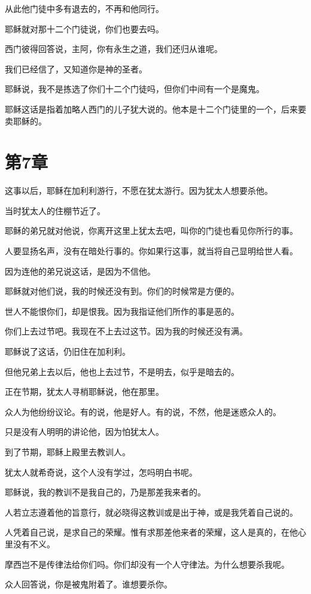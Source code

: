 \documentclass[12pt,oneside]{book}
\begin{document}
从此他门徒中多有退去的，不再和他同行。

耶稣就对那十二个门徒说，你们也要去吗。

西门彼得回答说，主阿，你有永生之道，我们还归从谁呢。

我们已经信了，又知道你是神的圣者。

耶稣说，我不是拣选了你们十二个门徒吗，但你们中间有一个是魔鬼。

耶稣这话是指着加略人西门的儿子犹大说的。他本是十二个门徒里的一个，后来要卖耶稣的。

\chapter{第7章}
这事以后，耶稣在加利利游行，不愿在犹太游行。因为犹太人想要杀他。

当时犹太人的住棚节近了。

耶稣的弟兄就对他说，你离开这里上犹太去吧，叫你的门徒也看见你所行的事。

人要显扬名声，没有在暗处行事的。你如果行这事，就当将自己显明给世人看。

因为连他的弟兄说这话，是因为不信他。

耶稣就对他们说，我的时候还没有到。你们的时候常是方便的。

世人不能恨你们，却是恨我。因为我指证他们所作的事是恶的。

你们上去过节吧。我现在不上去过这节。因为我的时候还没有满。

耶稣说了这话，仍旧住在加利利。

但他兄弟上去以后，他也上去过节，不是明去，似乎是暗去的。

正在节期，犹太人寻梢耶稣说，他在那里。

众人为他纷纷议论。有的说，他是好人。有的说，不然，他是迷惑众人的。

只是没有人明明的讲论他，因为怕犹太人。

到了节期，耶稣上殿里去教训人。

犹太人就希奇说，这个人没有学过，怎吗明白书呢。

耶稣说，我的教训不是我自己的，乃是那差我来者的。

人若立志遵着他的旨意行，就必晓得这教训或是出于神，或是我凭着自己说的。

人凭着自己说，是求自己的荣耀。惟有求那差他来者的荣耀，这人是真的，在他心里没有不义。

摩西岂不是传律法给你们吗。你们却没有一个人守律法。为什么想要杀我呢。

众人回答说，你是被鬼附着了。谁想要杀你。
\end{document}
